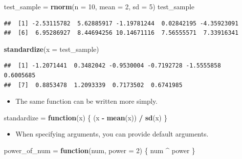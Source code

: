\documentclass[]{book}
\newenvironment{Shaded}{\begin{snugshade}}{\end{snugshade}}
\newcommand{\KeywordTok}[1]{\textcolor[rgb]{0.13,0.29,0.53}{\textbf{#1}}}
\newcommand{\DataTypeTok}[1]{\textcolor[rgb]{0.13,0.29,0.53}{#1}}
\newcommand{\DecValTok}[1]{\textcolor[rgb]{0.00,0.00,0.81}{#1}}
\newcommand{\StringTok}[1]{\textcolor[rgb]{0.31,0.60,0.02}{#1}}
\newcommand{\ControlFlowTok}[1]{\textcolor[rgb]{0.13,0.29,0.53}{\textbf{#1}}}
\newcommand{\OperatorTok}[1]{\textcolor[rgb]{0.81,0.36,0.00}{\textbf{#1}}}
\newcommand{\NormalTok}[1]{#1}
\providecommand{\tightlist}{%
  \setlength{\itemsep}{0pt}\setlength{\parskip}{0pt}}
\begin{document}
\begin{Shaded}
\begin{Highlighting}[]
\NormalTok{test_sample =}\StringTok{ }\KeywordTok{rnorm}\NormalTok{(}\DataTypeTok{n =} \DecValTok{10}\NormalTok{, }\DataTypeTok{mean =} \DecValTok{2}\NormalTok{, }\DataTypeTok{sd =} \DecValTok{5}\NormalTok{)}
\NormalTok{test_sample}
\end{Highlighting}
\end{Shaded}

\begin{verbatim}
##  [1] -2.53115782  5.62885917 -1.19781244  0.02842195 -4.35923091
##  [6]  6.95286927  8.44694256 10.14671116  7.56555571  7.33916341
\end{verbatim}

\begin{Shaded}
\begin{Highlighting}[]
\KeywordTok{standardize}\NormalTok{(}\DataTypeTok{x =}\NormalTok{ test_sample)}
\end{Highlighting}
\end{Shaded}

\begin{verbatim}
##  [1] -1.2071441  0.3482042 -0.9530004 -0.7192728 -1.5555858  0.6005685
##  [7]  0.8853478  1.2093339  0.7173502  0.6741985
\end{verbatim}

\begin{itemize}
\tightlist
\item
  The same function can be written more simply.
\end{itemize}

\begin{Shaded}
\begin{Highlighting}[]
\NormalTok{standardize =}\StringTok{ }\ControlFlowTok{function}\NormalTok{(x) \{}
\NormalTok{  (x }\OperatorTok{-}\StringTok{ }\KeywordTok{mean}\NormalTok{(x)) }\OperatorTok{/}\StringTok{ }\KeywordTok{sd}\NormalTok{(x)}
\NormalTok{\}}
\end{Highlighting}
\end{Shaded}

\begin{itemize}
\tightlist
\item
  When specifying arguments, you can provide default arguments.
\end{itemize}

\begin{Shaded}
\begin{Highlighting}[]
\NormalTok{power_of_num =}\StringTok{ }\ControlFlowTok{function}\NormalTok{(num, }\DataTypeTok{power =} \DecValTok{2}\NormalTok{) \{}
\NormalTok{  num }\OperatorTok{^}\StringTok{ }\NormalTok{power}
\NormalTok{\}}
\end{Highlighting}
\end{Shaded}
\end{document}
